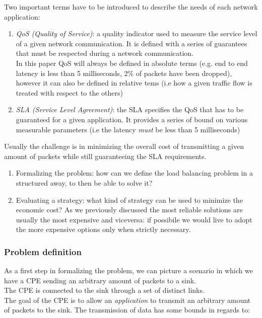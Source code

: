 \documentclass{article}
\begin{document}
 Two important terms have to be introduced to describe the needs of each network application:
 \begin{enumerate}
 	\item \textit{QoS (Quality of Service)}: a quality indicator used to measure the service level of a given network communication.  It is defined with a series of guarantees that must be respected during a network communication. \\
 	In this paper QoS will always be defined in absolute terms (e.g. end to end latency is less than 5 milliseconds,  2\% of packets have been dropped), however it can also be defined in relative tems (i.e how a given traffic flow is   treated with respect to the others)
 	\item \textit{SLA (Service Level Agreement)}: the SLA specifies the QoS that has to be guaranteed for a given application. It provides a series of bound on various measurable parameters (i.e the latency \textit{must} be less than 5 milliseconds)
 \end{enumerate}
 
 Usually the challenge is in minimizing the overall cost of transmitting a given amount of packets while still guaranteeing  the SLA requirements.
 \begin{enumerate}
 	\item Formalizing the problem: how can we define the load balancing problem in a structured away, to then be able to solve it?
 	\item Evaluating a strategy: what kind of strategy can be used to minimize the economic cost? As we previously discussed the most reliable solutions are usually the most expensive and viceversa: if possibile we would live to adopt the more expensive options only when strictly necessary.
 \end{enumerate}
 
\subsubsection{Problem definition}

As a first step in formalizing the problem,  we can picture a scenario in which we have a CPE sending an arbitrary amount of packets to a sink. \\

The CPE is connected to the sink through a set of distinct links. \\

The goal of the CPE is to allow an \textit{application} to  transmit an arbitrary amount of packets to the sink. The transmission of data has some bounds in regards to:
\end{document}
